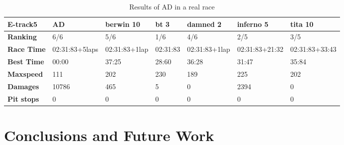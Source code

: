 \documentclass[runningheads,a4paper]{llncs}
\begin{document}
\begin{table}[!h]
	\caption{Results of AD in a real race}
	\label{16}
	\begin{tabular}{|p{2.3 cm}|p{1.75 cm}|p{1.75 cm}|p{1.75 cm}|p{1.75 cm}|p{1.75 cm}|p{1.75 cm}|}
		\hline \textbf{E-track5} & \textbf{AD} & \textbf{berwin 10} & \textbf{bt 3} &\textbf{damned 2} & \textbf{inferno 5} & \textbf{tita 10}  \\
		\hline \textbf{Ranking} & 6/6&5/6&1/6&4/6&2/5&3/5\\			
		\hline \textbf{Race Time}	& 02:31:83\newline+5laps&02:31:83\newline+1lap&02:31:83&02:31:83\newline+1lap&02:31:83\newline+21:32&02:31:83\newline+33:43 \\	
		\hline \textbf{Best Time}& 00:00&37:25&28:60&36:28&31:47&35:84\\	
		\hline \textbf{Maxspeed}& 111&202&230&189&225&202\\	
		\hline \textbf{Damages}& 10786&465&5&0&2394&0 \\	
		\hline \textbf{Pit stops} & 0&0&0&0&0&0\\ 
		\hline 
	\end{tabular}
\end{table}



	\section{Conclusions and Future Work} 
\label{sec:conclusions}
\newpage
	
	
	
	
	
	
	
	
\end{document}
